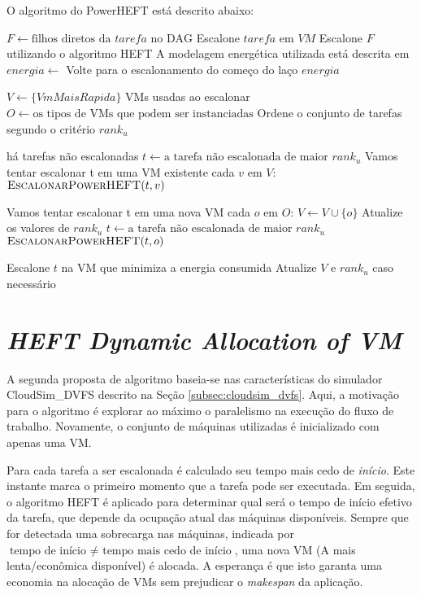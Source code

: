 O algoritmo do PowerHEFT está descrito abaixo:

\begin{codebox}
	\li $F \gets \text{filhos diretos da } tarefa \text{ no DAG}$
    \li Escalone $tarefa$ em $VM$
	\li Escalone $F$ utilizando o algoritmo \textsc{HEFT}
	\zi
	\li \Comment A modelagem energética utilizada está descrita em
    	\cite{guerout:energy_aware_simulation}
	\li $energia \gets$ 
		\li Volte para o escalonamento do começo do laço
	\li \Return $energia$
\end{codebox}


\begin{codebox}
	\li $V \gets \{VmMaisRapida\}$ \Comment VMs usadas ao escalonar
	\li $O \gets \text{os tipos de VMs que podem ser instanciadas}$
	\li Ordene o conjunto de tarefas segundo o critério $rank_u$
   
	\li \While há tarefas não escalonadas
		\li \Do $t \gets \text{a tarefa não escalonada de maior } rank_u$
		\zi
	    \li \Comment Vamos tentar escalonar t em uma VM existente
	    \li \For cada $v$ em $V$:
		    \li \Do	$\textnormal{\scshape EscalonarPowerHEFT}(t, v)$
	    \End
	    
	    \zi
	    \li \Comment Vamos tentar escalonar t em uma nova VM
	    \li \For cada $o$ em $O$:
		    \li \Do	$V \gets V \cup \{o\}$
		    \li Atualize os valores de $rank_u$
		    \li $t \gets \text{a tarefa não escalonada de maior } rank_u$
		    \li $\textnormal{\scshape EscalonarPowerHEFT}(t, o)$
	    \End
	    
	    \li Escalone $t$ na VM que minimiza a energia consumida
	    \li Atualize $V$ e $rank_u$ caso necessário
	\End
\End
\end{codebox}


\section{\emph{HEFT Dynamic Allocation of VM}} %
\label{sec:heft_davm}

A segunda proposta de algoritmo baseia-se nas características do simulador
CloudSim\_DVFS descrito na Seção \ref{subsec:cloudsim_dvfs}. Aqui, a motivação para
o algoritmo é explorar ao máximo o paralelismo na execução do fluxo de trabalho.
Novamente, o conjunto de máquinas utilizadas é inicializado com apenas uma VM.

Para cada tarefa a ser escalonada é calculado seu tempo mais cedo de
\emph{início}. Este instante marca o primeiro momento que a tarefa pode ser
executada. Em seguida, o algoritmo HEFT é aplicado para determinar qual será o
tempo de início efetivo da tarefa, que depende da ocupação atual das máquinas
disponíveis. Sempre que for detectada uma sobrecarga nas máquinas, indicada por
$\text{tempo de início } \neq \text{ tempo mais cedo de início}$, uma nova VM (A
mais lenta/econômica disponível) é alocada. A esperança é que isto garanta uma
economia na alocação de VMs sem prejudicar o \emph{makespan} da aplicação.


